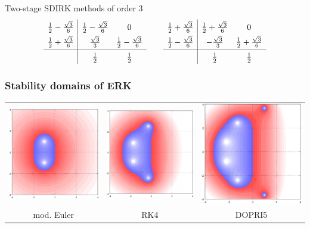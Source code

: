 \documentclass[USEnglish,ignorenonframetext,notheorems,aspectratio=1610]{beamer}
\begin{document}
\begin{frame}
  \begin{block}{Two-stage SDIRK methods of order 3}
    \begin{gather*}
      \def\arraystretch{1.5}
      \begin{array}{c|cc}
        \frac12 - \frac{\sqrt{3}}{6} & \frac12 - \frac{\sqrt{3}}{6} & 0 \\
        \frac12 + \frac{\sqrt{3}}{6} & \frac{\sqrt{3}}{3} & \frac12 - \frac{\sqrt{3}}{6} \\
        \hline
                                     & \frac12 & \frac12
      \end{array}
      \qquad
      \begin{array}{c|cc}
        \frac12 + \frac{\sqrt{3}}{6} & \frac12 + \frac{\sqrt{3}}{6} & 0 \\
        \frac12 - \frac{\sqrt{3}}{6} & -\frac{\sqrt{3}}{3} & \frac12 + \frac{\sqrt{3}}{6} \\
        \hline
                                     & \frac12 & \frac12
      \end{array}
    \end{gather*}
  \end{block}  
\end{frame}

\begin{frame}
  \frametitle{Stability domains of ERK}
  \begin{tabular}{ccc}
    \includegraphics[width=.3\textwidth]{fig/stability-RK2}
    &
    \includegraphics[width=.3\textwidth]{fig/stability-RK4}
    &
    \includegraphics[width=.3\textwidth]{fig/stability-DOPRI5}
    \\
    mod. Euler & RK4 & DOPRI5
  \end{tabular}
\end{frame}
\end{document}

